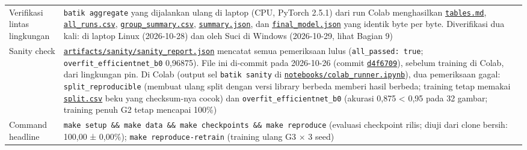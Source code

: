 \documentclass[10pt,a4paper]{article}
\begin{document}
{\begin{longtable}[]{@{}
  >{\raggedright\arraybackslash}p{}
  >{\raggedright\arraybackslash}p{}@{}}
Verifikasi lintas lingkungan & \texttt{batik\ aggregate} yang dijalankan ulang di laptop (CPU, PyTorch 2.5.1) dari run Colab menghasilkan \href{https://github.com/Universitas-Cakrawala/semarang-batik-fine-grained-transfer-learning/blob/main/artifacts/metrics/tables.md}{\texttt{tables.md}}, \href{https://github.com/Universitas-Cakrawala/semarang-batik-fine-grained-transfer-learning/blob/main/artifacts/metrics/all_runs.csv}{\texttt{all\_\allowbreak{}runs.csv}}, \href{https://github.com/Universitas-Cakrawala/semarang-batik-fine-grained-transfer-learning/blob/main/artifacts/metrics/group_summary.csv}{\texttt{group\_\allowbreak{}summary.csv}}, \href{https://github.com/Universitas-Cakrawala/semarang-batik-fine-grained-transfer-learning/blob/main/artifacts/metrics/summary.json}{\texttt{summary.json}}, dan \href{https://github.com/Universitas-Cakrawala/semarang-batik-fine-grained-transfer-learning/blob/main/artifacts/metrics/final_model.json}{\texttt{final\_\allowbreak{}model.json}} yang identik byte per byte. Diverifikasi dua kali: di laptop Linux (2026-10-28) dan oleh Suci di Windows (2026-10-29, lihat Bagian 9) \\
Sanity check & \href{https://github.com/Universitas-Cakrawala/semarang-batik-fine-grained-transfer-learning/blob/main/artifacts/sanity/sanity_report.json}{\texttt{artifacts/\allowbreak{}sanity/\allowbreak{}sanity\_\allowbreak{}report.json}} mencatat semua pemeriksaan lulus (\texttt{all\_passed:\ true}; \texttt{overfit\_\allowbreak{}efficientnet\_\allowbreak{}b0} 0,96875). File ini di-commit pada 2026-10-26 (commit \href{https://github.com/Universitas-Cakrawala/semarang-batik-fine-grained-transfer-learning/commit/d4f6709}{\texttt{d4f6709}}), sebelum training di Colab, dari lingkungan pin. Di Colab (output sel \texttt{batik\ sanity} di \href{https://github.com/Universitas-Cakrawala/semarang-batik-fine-grained-transfer-learning/blob/main/notebooks/colab_runner.ipynb}{\texttt{notebooks/\allowbreak{}colab\_\allowbreak{}runner.ipynb}}), dua pemeriksaan gagal: \texttt{split\_\allowbreak{}reproducible} (membuat ulang split dengan versi library berbeda memberi hasil berbeda; training tetap memakai \href{https://github.com/Universitas-Cakrawala/semarang-batik-fine-grained-transfer-learning/blob/main/data/manifests/split.csv}{\texttt{split.csv}} beku yang checksum-nya cocok) dan \texttt{overfit\_\allowbreak{}efficientnet\_\allowbreak{}b0} (akurasi 0,875 \textless{} 0,95 pada 32 gambar; training penuh G2 tetap mencapai 100\%) \\
Command headline & \texttt{make\ setup\ \&\&\ make\ data\ \&\&\ make\ checkpoints\ \&\&\ make\ reproduce} (evaluasi checkpoint rilis; diuji dari clone bersih: 100,00 ± 0,00\%); \texttt{make\ reproduce-retrain} (training ulang G3 × 3 seed) \\

\end{longtable}}
\end{document}
